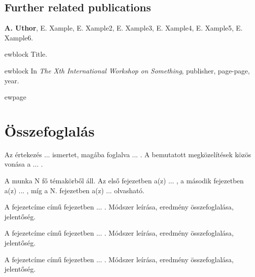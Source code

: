 \documentclass[12pt,a4paper]{extarticle}
\begin{document}
\vspace*{2.00em}

\subsection*{Further related publications}
\vspace*{1em}

\begin{enumerate}[wide = 0pt, widest = {[15]}, leftmargin =*]

\item[{[10]}] \textbf{A. Uthor}, E. Xample, E. Xample2, E. Xample3, E. Xample4, E. Xample5, E. Xample6.

ewblock {Title}.

ewblock In \emph{The Xth International Workshop on Something}, publisher, page-page, year.

\end{enumerate}

\vspace*{1em}


\renewcommand{\refname}{\large Other References }
 

\makeatletter
\apptocmd{\thebibliography}{\global\c@NAT@ctr 10\relax}{}{}
\makeatother





ewpage

\section{Összefoglalás}

Az értekezés ... ismertet, magába foglalva ... . A bemutatott megközelítések közös vonása a ... .

A munka N fő témakörből áll. Az első fejezetben a(z) ... , a második fejezetben a(z) ... , míg a N. fejezetben a(z) ... olvasható.

A fejezetcíme című fejezetben ... . Módszer leírása, eredmény összefoglalása, jelentőség.

A fejezetcíme című fejezetben ... . Módszer leírása, eredmény összefoglalása, jelentőség.

A fejezetcíme című fejezetben ... . Módszer leírása, eredmény összefoglalása, jelentőség.
\end{document}
